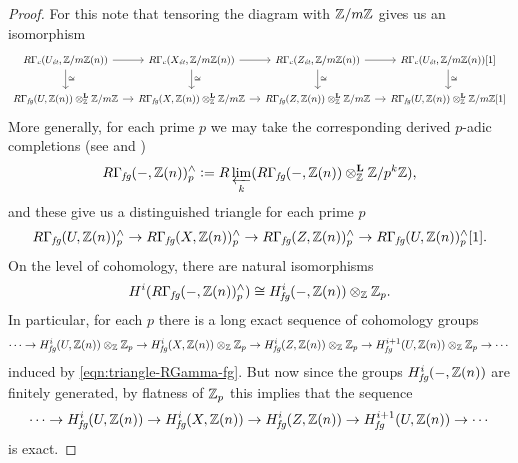 \documentclass{article}
\numberwithin{equation}{section}
\begin{document}
\begin{lemma}
\begin{proof}
    For this note that tensoring the diagram with $\mathbb{Z}/m\mathbb{Z}$ gives us an
    isomorphism
    \[ \begin{tikzcd}[column sep=1em,font=\small]
        R\Gamma_c (U_\et, \ZZ/m\ZZ (n)) \ar{r}\ar{d}{\cong} & R\Gamma_c (X_\et, \ZZ/m\ZZ (n)) \ar{r}\ar{d}{\cong} & R\Gamma_c (Z_\et, \ZZ/m\ZZ (n)) \ar{r}\ar{d}{\cong} & R\Gamma_c (U_\et, \ZZ/m\ZZ (n)) [1]\ar{d}{\cong} \\
        R\Gamma_\fg (U, \ZZ (n)) \otimes^\mathbf{L}_\ZZ \ZZ/m\ZZ \ar{r} & R\Gamma_\fg (X, \ZZ (n)) \otimes^\mathbf{L}_\ZZ \ZZ/m\ZZ \ar{r} & R\Gamma_\fg (Z, \ZZ (n)) \otimes^\mathbf{L}_\ZZ \ZZ/m\ZZ \ar{r} & R\Gamma_\fg (U, \ZZ (n)) \otimes^\mathbf{L}_\ZZ \ZZ/m\ZZ [1]
      \end{tikzcd} \]
    More generally, for each prime $p$ we may take the corresponding derived
    $p$-adic completions (see \cite{Bhatt-Scholze-2015} and
    \cite[Tag~091N]{Stacks-project})
    \[ R\Gamma_{\text{\it fg}} (-, \mathbb{Z}(n))^\wedge_p \mathrel{\mathop:}=
      R\varprojlim_k (R\Gamma_{\text{\it fg}} (-, \mathbb{Z}(n)) \otimes^\mathbf{L}_{\mathbb{Z}} \mathbb{Z}/p^k\mathbb{Z}), \]
    and these give us a distinguished triangle for each prime $p$
    \[ R\Gamma_{\text{\it fg}} (U, \mathbb{Z}(n))^\wedge_p \to
      R\Gamma_{\text{\it fg}} (X, \mathbb{Z}(n))^\wedge_p \to
      R\Gamma_{\text{\it fg}} (Z, \mathbb{Z}(n))^\wedge_p \to
      R\Gamma_{\text{\it fg}} (U, \mathbb{Z}(n))^\wedge_p [1]. \]
    On the level of cohomology, there are natural isomorphisms
    \cite[Tag~0A06]{Stacks-project}
    \[ H^i (R\Gamma_{\text{\it fg}} (-, \mathbb{Z}(n))^\wedge_p) \cong
      H^i_{\text{\it fg}} (-, \mathbb{Z}(n)) \otimes_{\mathbb{Z}} \mathbb{Z}_p. \]
    In particular, for each $p$ there is a long exact sequence of cohomology
    groups
    \[ \cdots \to H^i_{\text{\it fg}} (U, \mathbb{Z}(n)) \otimes_{\mathbb{Z}} \mathbb{Z}_p \to
      H^i_{\text{\it fg}} (X, \mathbb{Z}(n)) \otimes_{\mathbb{Z}} \mathbb{Z}_p \to
      H^i_{\text{\it fg}} (Z, \mathbb{Z}(n)) \otimes_{\mathbb{Z}} \mathbb{Z}_p \to
      H^{i+1}_{\text{\it fg}} (U, \mathbb{Z}(n)) \otimes_{\mathbb{Z}} \mathbb{Z}_p \to \cdots \]
    induced by \eqref{eqn:triangle-RGamma-fg}. But now since the groups
    $H^i_{\text{\it fg}} (-, \mathbb{Z}(n))$ are finitely generated, by flatness of $\mathbb{Z}_p$ this
    implies that the sequence
    \begin{equation}
      \label{eqn:RGamma-fg-long-exact-sequence}
      \cdots \to H^i_{\text{\it fg}} (U, \mathbb{Z}(n)) \to
      H^i_{\text{\it fg}} (X, \mathbb{Z}(n)) \to
      H^i_{\text{\it fg}} (Z, \mathbb{Z}(n)) \to
      H^{i+1}_{\text{\it fg}} (U, \mathbb{Z}(n)) \to \cdots
    \end{equation}
    is exact.


\end{proof}
\end{lemma}
\end{document}
